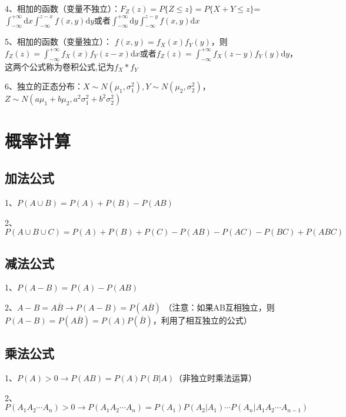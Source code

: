 4、相加的函数（变量不独立）：$ F_{Z}(z)=P\{Z \leqslant z\}=P\{X+Y \leqslant z\} $=$ \int_{-\infty}^{+\infty} \mathrm{d} x \int_{-\infty}^{z-x} f(x, y) \mathrm{d} y $或者$ \int_{-\infty}^{+\infty} \mathrm{d} y \int_{-\infty}^{z-y} f(x, y) \mathrm{d} x $

5、相加的函数（变量独立）： $ f(x, y)=f_{X}(x) f_{Y}(y) $，则$ f_{Z}(z)=\int_{-\infty}^{+\infty} f_{X}(x) f_{Y}(z-x) \mathrm{d} x $或者$ f_{Z}(z)=\int_{-\infty}^{+\infty} f_{X}(z-y) f_{Y}(y) \mathrm{d} y $，这两个公式称为卷积公式,记为$ f_{X} * f_{Y} $

6、独立的正态分布：$ X \sim{N}\left(\mu_{1}, \sigma_{1}^{2}\right), Y \sim N\left(\mu_{2}, \sigma_{2}^{2}\right) $，$ Z \sim N\left(a\mu_{1}+b\mu_{2}, a^2\sigma_{1}^{2}+b^2\sigma_{2}^{2}\right) $

\section{概率计算}



\subsection{加法公式}

1、$ P(A\cup B) = P(A)+P(B)-P(AB) $

2、$ P(A\cup B \cup C) = P(A)+P(B)+P(C)-P(AB)-P(AC)-P(BC)+P(ABC) $



\subsection{减法公式}

1、$ P(A - B) = P(A)-P(AB) $

2、$ A-B=A\overline B \rightarrow P(A-B) = P(A\overline B) $ （注意：如果AB互相独立，则$ P(A-B) = P(A\overline B)=P(A)P(\overline B) $，利用了相互独立的公式）



\subsection{乘法公式}

1、$ P(A)>0 \rightarrow P(AB)=P(A)P(B|A) $（非独立时乘法运算）

2、$ P(A_1A_2\cdots A_n) > 0 \rightarrow P(A_1A_2\cdots A_n)=P(A_1)P(A_2|A_1)\cdots P(A_n|A_1A_2\cdots A_{n-1}) $

